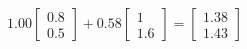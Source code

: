 \documentclass[preview]{standalone}
\begin{document}
\begin{align*}
1.00 \begin{bmatrix} 0.8 \\ 0.5 \end{bmatrix} + 0.58 \begin{bmatrix} 1 \\ 1.6 \end{bmatrix} = \begin{bmatrix} 1.38 \\ 1.43 \end{bmatrix}
\end{align*}
\end{document}

